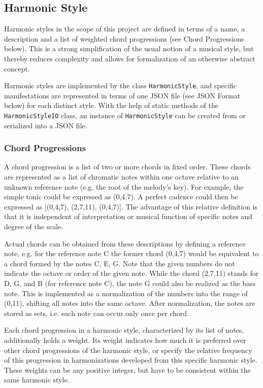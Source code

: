 
\subsection{Harmonic Style}
Harmonic styles in the scope of this project are defined in terms of a name, a description and a list of weighted chord progressions (see Chord Progressions below). This is a strong simplification of the usual notion of a musical style, but thereby reduces complexity and allows for formalization of an otherwise abstract concept.

Harmonic styles are implemented by the class \texttt{HarmonicStyle}, and specific manifestations are represented in terms of one JSON file (see JSON Format below) for each distinct style. With the help of static methods of the \texttt{HarmonicStyleIO} class, an instance of \texttt{HarmonicStyle} can be created from or serialized into a JSON file.

\subsubsection{Chord Progressions}
A chord progression is a list of two or more chords in fixed order. These chords are represented as a list of chromatic notes within one octave relative to an unknown reference note (e.g. the root of the melody's key). For example, the simple tonic could be expressed as (0,4,7). A perfect cadence could then be expressed as [(0,4,7), (2,7,11), (0,4,7)]. The advantage of this relative definition is that it is independent of interpretation or musical function of specific notes and degree of the scale.

Actual chords can be obtained from these descriptions by defining a reference note, e.g. for the reference note C the former chord (0,4,7) would be equivalent to a chord formed by the notes C, E, G. Note that the given numbers do not indicate the octave or order of the given note. While the chord (2,7,11) stands for D, G, and B (for reference note C), the note G could also be realized as the bass note. This is implemented as a normalization of the numbers into the range of (0,11), shifting all notes into the same octave. After normalization, the notes are stored as sets, i.e. each note can occur only once per chord.

Each chord progression in a harmonic style, characterized by its list of notes, additionally holds a weight. Its weight indicates how much it is preferred over other chord progressions of the harmonic style, or specify the relative frequency of this progression in harmonizations developed from this specific harmonic style. These weights can be any positive integer, but have to be consistent within the same harmonic style.

